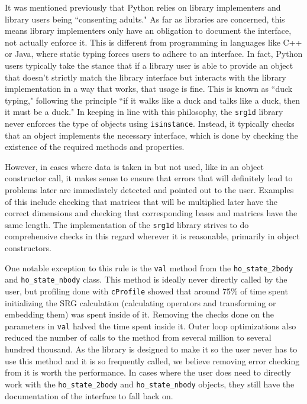 It was mentioned previously that Python relies on library implementers and library users being ``consenting adults." As far as libraries are concerned, this means library implementers only have an obligation to document the interface, not actually enforce it. This is different from programming in languages like C++ or Java, where static typing forces users to adhere to an interface. In fact, Python users typically take the stance that if a library user is able to provide an object that doesn't strictly match the library interface but interacts with the library implementation in a way that works, that usage is fine. This is known as ``duck typing," following the principle ``if it walks like a duck and talks like a duck, then it must be a duck." In keeping in line with this philosophy, the \texttt{srg1d} library never enforces the type of objects using \texttt{isinstance}. Instead, it typically checks that an object implements the necessary interface, which is done by checking the existence of the required methods and properties.

However, in cases where data is taken in but not used, like in an object constructor call, it makes sense to ensure that errors that will definitely lead to problems later are immediately detected and pointed out to the user. Examples of this include checking that matrices that will be multiplied later have the correct dimensions and checking that corresponding bases and matrices have the same length. The implementation of the \texttt{srg1d} library strives to do comprehensive checks in this regard wherever it is reasonable, primarily in object constructors.

One notable exception to this rule is the \texttt{val} method from the \texttt{ho\_state\_2body} and \texttt{ho\_state\_nbody} class. This method is ideally never directly called by the user, but profiling done with \texttt{cProfile} showed that around 75\% of time spent initializing the SRG calculation (calculating operators and transforming or embedding them) was spent inside of it. Removing the checks done on the parameters in \texttt{val} halved the time spent inside it. Outer loop optimizations also reduced the number of calls to the method from several million to several hundred thousand. As the library is designed to make it so the user never has to use this method and it is so frequently called, we believe removing error checking from it is worth the performance. In cases where the user does need to directly work with the \texttt{ho\_state\_2body} and \texttt{ho\_state\_nbody} objects, they still have the documentation of the interface to fall back on.

